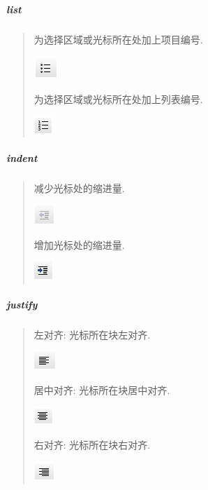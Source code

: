 \documentclass[letterpaper,10pt,english]{sphinxmanual}
\begin{document}
\subparagraph{list}
\label{relatedproj/editorguide/plugin:list}\begin{quote}

为选择区域或光标所在处加上项目编号.

\includegraphics{list11.png}

为选择区域或光标所在处加上列表编号.

\includegraphics{list21.png}
\end{quote}


\subparagraph{indent}
\label{relatedproj/editorguide/plugin:indent}\begin{quote}

减少光标处的缩进量.

\includegraphics{indent11.png}

增加光标处的缩进量.

\includegraphics{indent21.png}
\end{quote}


\subparagraph{justify}
\label{relatedproj/editorguide/plugin:justify}\begin{quote}

左对齐: 光标所在块左对齐.

\includegraphics{justify11.png}

居中对齐: 光标所在块居中对齐.

\includegraphics{justify21.png}

右对齐: 光标所在块右对齐.

\includegraphics{justify31.png}
\end{quote}
\end{document}
